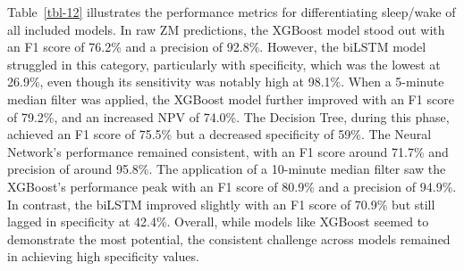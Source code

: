 \documentclass[
  10pt,
]{scrbook}
\begin{document}
Table~\ref{tbl-12} illustrates the performance metrics for
differentiating sleep/wake of all included models. In raw ZM
predictions, the XGBoost model stood out with an F1 score of 76.2\% and
a precision of 92.8\%. However, the biLSTM model struggled in this
category, particularly with specificity, which was the lowest at 26.9\%,
even though its sensitivity was notably high at 98.1\%. When a 5-minute
median filter was applied, the XGBoost model further improved with an F1
score of 79.2\%, and an increased NPV of 74.0\%. The Decision Tree,
during this phase, achieved an F1 score of 75.5\% but a decreased
specificity of 59\%. The Neural Network's performance remained
consistent, with an F1 score around 71.7\% and precision of around
95.8\%. The application of a 10-minute median filter saw the XGBoost's
performance peak with an F1 score of 80.9\% and a precision of 94.9\%.
In contrast, the biLSTM improved slightly with an F1 score of 70.9\% but
still lagged in specificity at 42.4\%. Overall, while models like
XGBoost seemed to demonstrate the most potential, the consistent
challenge across models remained in achieving high specificity values.

\begingroup

\footnotesize
\end{document}
